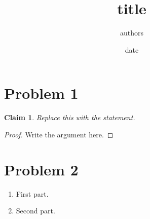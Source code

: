 \documentclass[11pt]{article}
\title{{{title}}}
\author{{{authors}}}
\date{{{date}}}
\newtheorem*{claim}{Claim}
\begin{document}
\maketitle

\section*{Problem 1}
\begin{claim}
Replace this with the statement.
\end{claim}
\begin{proof}
Write the argument here.
\end{proof}

\section*{Problem 2}
\begin{enumerate}[label=(\alph*)]
  \item First part.
  \item Second part.
\end{enumerate}
\end{document}
